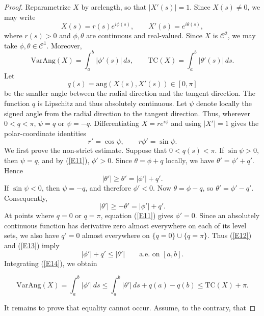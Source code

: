 \documentclass[reqno]{amsart}
\theoremstyle{definition}
\newcommand{\ang}{\mathrm{ang}}
\newcommand{\T}{\mathrm{TC}}
\newcommand{\VA}{\mathrm{VarAng}}
\newcommand{\cC}{\mathcal{C}}
\numberwithin{equation}{section}
\begin{document}
\begin{proof}
Reparametrize $X$ by arclength, so that $|X'(s)|=1$. Since
$X(s)\neq 0$, we may write
\[
    X(s)=r(s)e^{i\phi(s)},
    \qquad
    X'(s)=e^{i\theta(s)},
\]
where $r(s)>0$ and $\phi,\theta$ are continuous and real-valued. Since $X$ is $\cC^2$, we may take $\phi,\theta\in \cC^1$. Moreover,
\[\VA(X)=\int_a^b |\phi'(s)|\,ds,\qquad \T(X)=\int_a^b |\theta'(s)|\,ds.\]
Let
\[q(s)=\ang\left(X(s),X'(s)\right)\in[0,\pi]\]
be the smaller angle between the radial direction and the tangent direction. The function $q$ is Lipschitz and thus absolutely continuous. Let $\psi$ denote locally the signed angle from the radial direction to the tangent direction. Thus, wherever $0<q<\pi$, $\psi=q$ or $\psi=-q.$
Differentiating $X=re^{i\phi}$ and using $|X'|=1$ gives the polar-coordinate identities
\begin{equation}
	r'=\cos\psi,\qquad r\phi'=\sin\psi.
    \label{E11}
\end{equation}
We first prove the non-strict estimate. Suppose that
$0<q(s)<\pi$. If $\sin\psi>0$, then $\psi=q$, and by (\ref{E11}),
$\phi'>0$. Since $\theta=\phi+q$
locally, we have $\theta'=\phi'+q'.$
Hence
\begin{equation}
	|\theta'|\ge \theta'=|\phi'|+q'.
  \label{E12}
\end{equation}
If $\sin\psi<0$, then $\psi=-q$, and therefore $\phi'<0$. Now $\theta=\phi-q$,
so $\theta'=\phi'-q'.$
Consequently,
\begin{equation}|\theta'|\ge -\theta'=|\phi'|+q'.
    \label{E13}
\end{equation}
At points where $q=0$ or $q=\pi$, equation (\ref{E11}) gives
$\phi'=0$. Since an absolutely continuous function has derivative
zero almost everywhere on each of its level sets, we also have
$q'=0$ almost everywhere on $\{q=0\}\cup\{q=\pi\}.$
Thus (\ref{E12}) and (\ref{E13}) imply
\begin{equation}|\phi'|+q'\le |\theta'|\qquad\text{a.e. on }[a,b].
    \label{E14}
\end{equation}
Integrating (\ref{E14}), we obtain

\begin{equation}
    \VA(X)=\int_a^b |\phi'|\,ds\le\int_a^b|\theta'|\,ds+q(a)-q(b)\le \T(X)+\pi .
\label{E15}
\end{equation}

It remains to prove that equality cannot occur. Assume, to the contrary, that


\end{proof}
\end{document}
